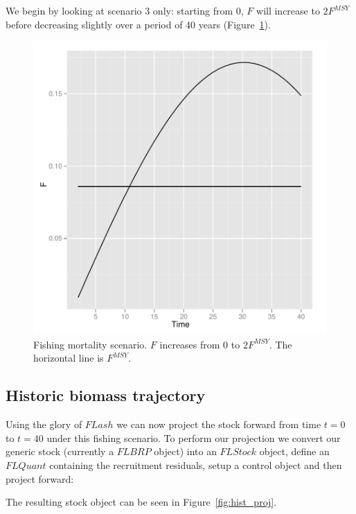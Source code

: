 \documentclass[a4paper]{article}
\begin{document}
We begin by looking at scenario 3 only: starting from 0, $F$ will increase to $2F^{MSY}$
before decreasing slightly over a period of 40 years (Figure~\ref{fig:Fscenario}). 

\begin{figure}
\centering
\includegraphics{script-005}
\caption{Fishing mortality scenario. $F$ increases from 0 to $2F^{MSY}$. The horizontal line is $F^{MSY}$.}
\label{fig:Fscenario}
\end{figure}

\subsection{Historic biomass trajectory}

Using the glory of $FLash$ we can now project the stock forward from time $t=0$ to $t=40$ under this fishing
scenario. To perform our projection we convert our generic stock (currently a $FLBRP$ object) into an $FLStock$ object,
define an $FLQuant$ containing the recruitment residuals, setup a control object and then project forward:


The resulting stock object can be seen in Figure~\ref{fig:hist_proj}.
\end{document}

